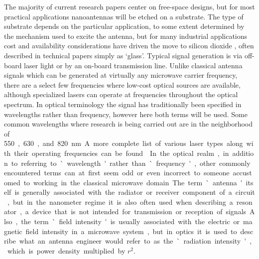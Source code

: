 \documentclass[11pt]{article}
\begin{document}
%
The majority of current research papers center on free-space designs, but for most practical applications nanoantennas will be etched on a substrate. The type of substrate depends on the particular application, to some extent determined by the mechanism used to excite the antenna, but for many industrial applications cost and availability considerations have driven the move to silicon dioxide , often described in technical papers simply as  `glass'. Typical signal generation is via off-board laser light or by an on-board transmission line. Unlike classical antenna signals which can be generated at virtually any microwave carrier frequency, there are a select few frequencies where low-cost optical sources are available, although specialized lasers can operate at frequencies throughout the optical spectrum. In optical terminology the signal has traditionally been specified in wavelengths rather than frequency, however here both terms will be used. Some common wavelengths where research is being carried out are in the neighborhood of
\SI{550}, \SI{630}, and \SI{820}{\nano\metre}. A more complete list of various laser types along with their operating frequencies can be found \cite{Weber2000}.

In the optical realm, in addition to referring to `wavelength' rather than `frequency', other commonly encountered terms can at first seem odd or even incorrect to someone accustomed to working in the classical microwave domain. The term `antenna' itself is generally associated with the radiator or receiver component of a circuit, but in the nanometer regime it is also often used when describing a resonator, a device that is not intended for transmission or reception of signals. Also, the term `field intensity' is usually associated with the electric or magnetic field intensity in a microwave system, but in optics it is used to describe what an antenna engineer would refer to as the  `radiation intensity', which is power density multiplied by $r^2$.
\end{document}
